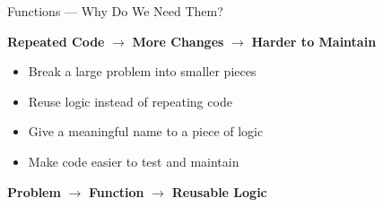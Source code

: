 \begin{frame}{Functions — Why Do We Need Them?}

    \begin{center}
        \Large
        \textbf{Repeated Code}
        $\longrightarrow$
        \textbf{More Changes}
        $\longrightarrow$
        \textbf{Harder to Maintain}
    \end{center}

    \vspace{0.8cm}

    \begin{itemize}
        \item Break a large problem into smaller pieces
        \item Reuse logic instead of repeating code
        \item Give a meaningful name to a piece of logic
        \item Make code easier to test and maintain
    \end{itemize}

    \vfill

    \begin{center}
        \Large
        \textbf{Problem}
        $\rightarrow$
        \textbf{Function}
        $\rightarrow$
        \textbf{Reusable Logic}
    \end{center}

\end{frame}
